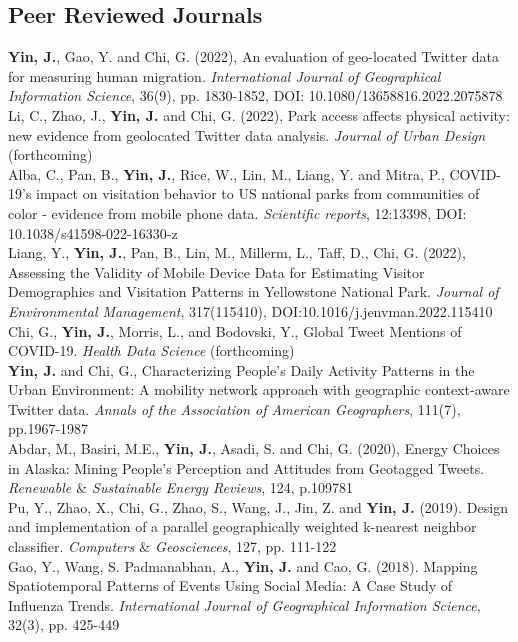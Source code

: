 \documentclass[11pt, a4paper]{article}
\newcommand{\years}[1]{\marginnote{\scriptsize #1}}
\begin{document}
\subsection*{Peer Reviewed Journals}
\noindent
\years{2022}\textbf{Yin, J.}, Gao, Y. and Chi, G. (2022), An evaluation of geo-located Twitter data for measuring human migration. \textit{International Journal of Geographical Information Science}, 36(9), pp. 1830-1852, DOI: 10.1080/13658816.2022.2075878\\
\years{2022}Li, C., Zhao, J., \textbf{Yin, J.}  and Chi, G. (2022), Park access affects physical activity: new evidence from geolocated Twitter data analysis. \textit{Journal of Urban Design} (forthcoming)\\
\years{2022}Alba, C., Pan, B., \textbf{Yin, J.},  Rice, W., Lin, M.,  Liang, Y. and Mitra, P., COVID-19's impact on visitation behavior to US national parks from communities of color - evidence from mobile phone data. \textit{Scientific reports}, 12:13398, DOI: 10.1038/s41598-022-16330-z\\
\years{2022}Liang, Y., \textbf{Yin, J.},  Pan, B.,  Lin, M., Millerm, L., Taff, D., Chi, G. (2022), Assessing the Validity of Mobile Device Data for Estimating Visitor Demographics and Visitation Patterns in Yellowstone National Park. \textit{Journal of Environmental Management}, 317(115410), DOI:10.1016/j.jenvman.2022.115410\\
\years{2022}Chi, G., \textbf{Yin, J.}, Morris, L., and Bodovski, Y., Global Tweet Mentions of COVID-19. \textit{Health Data Science} (forthcoming)\\
\years{2021}\textbf{Yin, J.} and  Chi, G., Characterizing People’s Daily Activity Patterns in the Urban Environment: A mobility network approach with geographic context-aware Twitter data. \textit{Annals of the Association of American Geographers}, 111(7), pp.1967-1987\\
\years{2020}Abdar, M., Basiri, M.E., \textbf{Yin, J.}, Asadi, S. and Chi, G. (2020), Energy Choices in Alaska: Mining People's Perception and Attitudes from Geotagged Tweets. \textit{Renewable $\&$ Sustainable Energy Reviews}, 124, p.109781\\
\years{2019}Pu, Y., Zhao, X., Chi, G., Zhao, S., Wang, J., Jin, Z. and \textbf{Yin, J.} (2019). Design and implementation of a parallel geographically weighted k-nearest neighbor classifier. \textit{Computers $\&$ Geosciences}, 127, pp. 111-122\\
\years{2018}Gao, Y., Wang, S. Padmanabhan, A., \textbf{Yin, J.} and Cao, G. (2018). Mapping Spatiotemporal Patterns of Events Using Social Media: A Case Study of Influenza Trends. \textit{International Journal of Geographical Information Science}, 32(3), pp. 425-449\\
\end{document}
